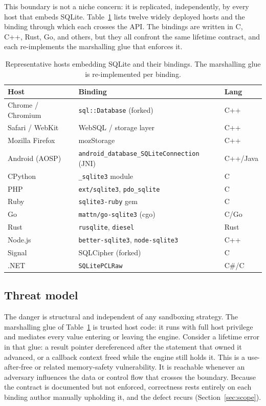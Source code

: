 \documentclass[10pt,twocolumn]{article}
\begin{document}
This boundary is not a niche concern: it is replicated, independently, by every
host that embeds SQLite. Table~\ref{tab:hosts} lists twelve widely deployed
hosts and the binding through which each crosses the API. The bindings are
written
in C, C++, Rust, Go, and others, but they all confront the same lifetime
contract, and each re-implements the marshalling glue that enforces it.

\begin{table}[t]
\centering
\caption{Representative hosts embedding SQLite and their bindings. The
marshalling glue is re-implemented per binding.}
\label{tab:hosts}
\footnotesize
\renewcommand{\arraystretch}{1.15}
\begin{tabular}{@{}p{2.7cm} p{3.0cm} l@{}}
\toprule
\textbf{Host} & \textbf{Binding} & \textbf{Lang} \\
\midrule
Chrome / Chromium   & \texttt{sql::Database} (forked) & C++ \\
Safari / WebKit     & WebSQL / storage layer          & C++ \\
Mozilla Firefox     & mozStorage                      & C++ \\
Android (AOSP)      & \texttt{android\_database\_}\allowbreak\texttt{SQLiteConnection} (JNI) & C++/Java \\
CPython             & \texttt{\_sqlite3} module        & C \\
PHP                 & \texttt{ext/sqlite3}, \texttt{pdo\_sqlite} & C \\
Ruby                & \texttt{sqlite3-ruby} gem        & C \\
Go                  & \texttt{mattn/go-sqlite3} (cgo)  & C/Go \\
Rust                & \texttt{rusqlite}, \texttt{diesel} & Rust \\
Node.js             & \texttt{better-sqlite3}, \texttt{node-sqlite3} & C++ \\
Signal              & SQLCipher (forked)               & C \\
.NET                & \texttt{SQLitePCLRaw}            & C\#/C \\
\bottomrule
\end{tabular}
\end{table}

\subsection{Threat model}
The danger is structural and independent of any sandboxing strategy. The
marshalling glue of Table~\ref{tab:hosts} is trusted host code: it runs with
full host privilege and mediates every value entering or leaving the engine.
Consider a lifetime error in that glue: a result pointer dereferenced after the
statement that owned it advanced, or a callback context freed while the engine
still holds it. This is a use-after-free or related memory-safety vulnerability.
It is reachable whenever an adversary influences the data or control flow that
crosses the boundary. Because the contract is documented but not enforced,
correctness rests entirely on each binding author manually upholding it, and
the defect recurs (Section~\ref{sec:scope}).
\end{document}

